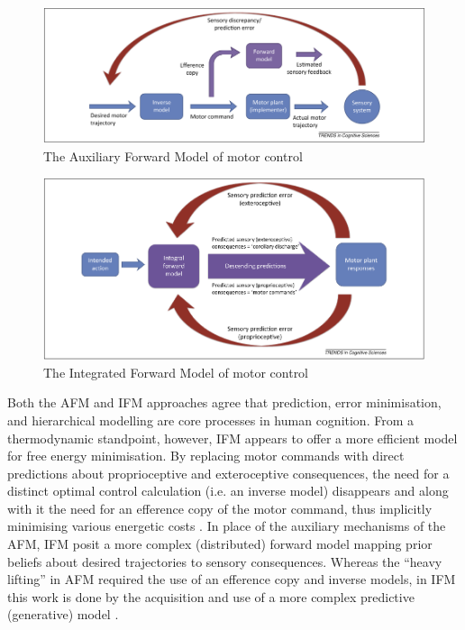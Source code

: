 \begin{figure}[htbp]
  \begin{center}
    \includegraphics[scale=.5]{images/AFM.png}
      \caption{The Auxiliary Forward Model of motor control}
        \label{fig:AFM}
   \end{center}
\end{figure}

\begin{figure}[htbp]
  \begin{center}
    \includegraphics[scale=.5]{images/IFM.png}
      \caption{The Integrated Forward Model of motor control}
        \label{fig:IFM}
   \end{center}
\end{figure}


Both the AFM and IFM approaches agree that prediction, error minimisation, and hierarchical modelling are core processes in human cognition. From a thermodynamic standpoint, however, IFM appears to offer a more efficient model for free energy minimisation.  By replacing motor commands with direct predictions about proprioceptive and exteroceptive consequences, the need for a distinct optimal control calculation (i.e. an inverse model) disappears and along with it the need for an efference copy of the motor command, thus implicitly minimising various energetic costs \citep{Pickering2014,Friston2010}.   In place of the auxiliary mechanisms of the AFM, IFM posit a more complex (distributed) forward model mapping prior beliefs about desired trajectories to sensory consequences.  Whereas the ``heavy lifting'' in AFM required the use of an efference copy and inverse models, in IFM this work is done by the acquisition and use of a more complex predictive (generative) model \citep{Pickering2014}.

